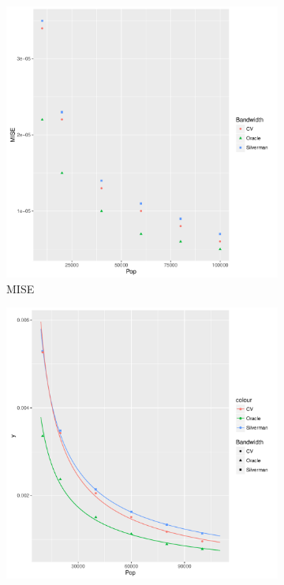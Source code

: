\begin{figure}[htbp]
    \centering
    \begin{subfigure}[b]{0.3\textwidth}
    \includegraphics[width=\textwidth]{results/by_pop_size/MISE-vs-population}
    \caption{MISE}
    \end{subfigure}
    \begin{subfigure}[b]{0.3\textwidth}
    \includegraphics[width=\textwidth]{results/by_pop_size/RMISE-vs-population}

\end{subfigure}
\end{figure}
